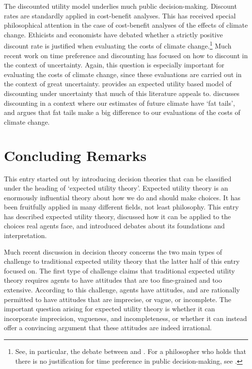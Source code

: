 The discounted utility model underlies much public decision-making. Discount rates are standardly applied in cost-benefit analyses. This has received special philosophical attention in the case of cost-benefit analyses of the effects of climate change. Ethicists and economists have debated whether a strictly positive discount rate is justified when evaluating the costs of climate change.\footnote{See, in particular, the debate between \citet{Stern2007} and \citet{Nordhaus2007}. For a philosopher who holds that there is no justification for time preference in public decision-making, see \citet{Broome1994}.} Much recent work on time preference and discounting has focused on how to discount in the context of uncertainty. Again, this question is especially important for evaluating the costs of climate change, since these evaluations are carried out in the context of great uncertainty. \citet{Gollier2002} provides an expected utility based model of discounting under uncertainty that much of this literature appeals to. \citet{Weitzman2009} discusses discounting in a context where our estimates of future climate have `fat tails', and argues that fat tails make a big difference to our evaluations of the costs of climate change.

\section{Concluding Remarks}

This entry started out by introducing decision theories that can be classified under the heading of `expected utility theory'. Expected utility theory is an enormously influential theory about how we do and should make choices. It has been fruitfully applied in many different fields, not least philosophy. This entry has described expected utility theory, discussed how it can be applied to the choices real agents face, and introduced debates about its foundations and interpretation.

Much recent discussion in decision theory concerns the two main types of challenge to traditional expected utility theory that the latter half of this entry focused on. The first type of challenge claims that traditional expected utility theory requires agents to have attitudes that are too fine-grained and too extensive. According to this challenge, agents have attitudes, and are rationally permitted to have attitudes that are imprecise, or vague, or incomplete. The important question arising for expected utility theory is whether it can incorporate imprecision, vagueness, and incompleteness, or whether it can instead offer a convincing argument that these attitudes are indeed irrational.

